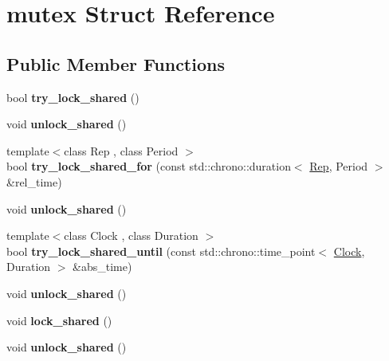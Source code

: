 \hypertarget{structmutex}{}\section{mutex Struct Reference}
\label{structmutex}
\subsection*{Public Member Functions}
\begin{DoxyCompactItemize}
\item 
\mbox{\label{structmutex_aedb77e24476fae4c3d2754a35b3ceda2}} 
bool {\bfseries try\+\_\+lock\+\_\+shared} ()
\item 
\mbox{\label{structmutex_acd087c9ce5458dae0ddea9f7400f4a41}} 
void {\bfseries unlock\+\_\+shared} ()
\item 
\mbox{\label{structmutex_a0dbb26ad478e8a127073c74dc7a88747}} 
{\footnotesize template$<$class Rep , class Period $>$ }\\bool {\bfseries try\+\_\+lock\+\_\+shared\+\_\+for} (const std\+::chrono\+::duration$<$ \mbox{\hyperlink{class_rep}{Rep}}, Period $>$ \&rel\+\_\+time)
\item 
\mbox{\label{structmutex_acd087c9ce5458dae0ddea9f7400f4a41}} 
void {\bfseries unlock\+\_\+shared} ()
\item 
\mbox{\label{structmutex_ac52a281a107968c5367a54544ae96543}} 
{\footnotesize template$<$class Clock , class Duration $>$ }\\bool {\bfseries try\+\_\+lock\+\_\+shared\+\_\+until} (const std\+::chrono\+::time\+\_\+point$<$ \mbox{\hyperlink{struct_clock}{Clock}}, Duration $>$ \&abs\+\_\+time)
\item 
\mbox{\label{structmutex_acd087c9ce5458dae0ddea9f7400f4a41}} 
void {\bfseries unlock\+\_\+shared} ()
\item 
\mbox{\label{structmutex_a10783f3fb3f8fee9e5cf47d07dacdfa3}} 
void {\bfseries lock\+\_\+shared} ()
\item 
\mbox{\label{structmutex_acd087c9ce5458dae0ddea9f7400f4a41}} 
void {\bfseries unlock\+\_\+shared} ()

\end{DoxyCompactItemize}
